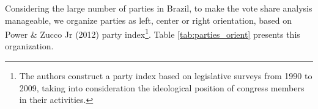 \documentclass[
  12pt,
]{article}
\begin{document}
Considering the large number of parties in Brazil, to make the vote
share analysis manageable, we organize parties as left, center or right
orientation, based on Power \& Zucco Jr (2012) party index\footnote{The
  authors construct a party index based on legislative surveys from 1990
  to 2009, taking into consideration the ideological position of
  congress members in their activities.}. Table \ref{tab:parties_orient}
presents this organization.

\begin{table}[!h]

\caption{\label{tab:parties_orient}Party classification according to orientation (left, center or right)}
\centering
{}
\end{table}
\end{document}
